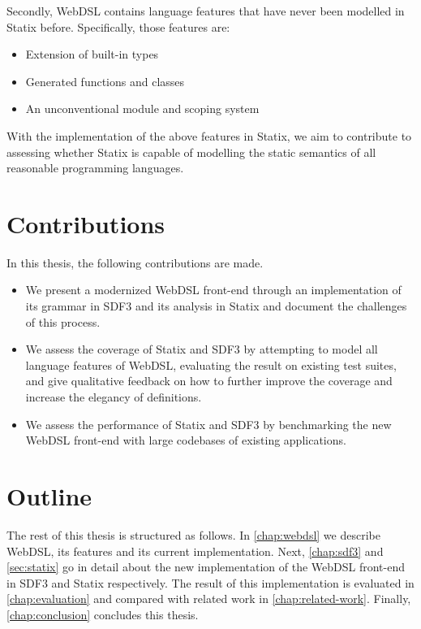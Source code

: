     Secondly, WebDSL contains language features that have never been modelled in Statix before. Specifically, those features are:

    \begin{itemize}
      \item Extension of built-in types
      \item Generated functions and classes
      \item An unconventional module and scoping system
    \end{itemize}

    With the implementation of the above features in Statix, we aim to contribute to assessing whether Statix is capable of modelling the static semantics of all reasonable programming languages.

  \section{\label{sec:contributions}Contributions}

    In this thesis, the following contributions are made.

    \begin{itemize}
      \item We present a modernized WebDSL front-end through an implementation of its grammar in SDF3 and its analysis in Statix and document the challenges of this process.
      \item We assess the coverage of Statix and SDF3 by attempting to model all language features of WebDSL, evaluating the result on existing test suites, and give qualitative feedback on how to further improve the coverage and increase the elegancy of definitions.
      \item We assess the performance of Statix and SDF3 by benchmarking the new WebDSL front-end with large codebases of existing applications.
    \end{itemize}

  \section{\label{sec:outline}Outline}
    The rest of this thesis is structured as follows. In \cref{chap:webdsl} we describe WebDSL, its features and its current implementation. Next, \cref{chap:sdf3} and \cref{sec:statix} go in detail about the new implementation of the WebDSL front-end in SDF3 and Statix respectively. The result of this implementation is evaluated in \cref{chap:evaluation} and compared with related work in \cref{chap:related-work}. Finally, \cref{chap:conclusion} concludes this thesis.
